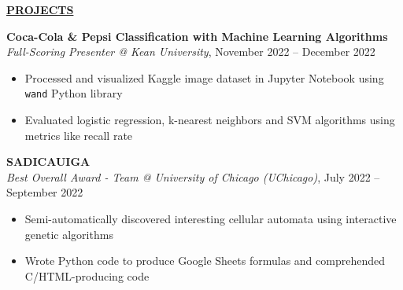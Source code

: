 \documentclass[
]{article}
\providecommand{\tightlist}{%
  \setlength{\itemsep}{0pt}\setlength{\parskip}{0pt}}
\begin{document}
\textbf{\underline{PROJECTS}}

\textbf{Coca-Cola \& Pepsi Classification with Machine Learning Algorithms} \\
\emph{Full-Scoring Presenter @ Kean University}, November 2022 -- December 2022

\begin{itemize}
\tightlist
\item
Processed and visualized Kaggle image dataset in Jupyter Notebook using \texttt{wand} Python library 
\end{itemize}

\begin{itemize}
\tightlist
\item
Evaluated logistic regression, k-nearest neighbors and SVM algorithms using metrics like recall rate  
\end{itemize}

\textbf{SADICAUIGA} \\
\emph{Best Overall Award - Team @ University of Chicago (UChicago)}, July 2022 -- September 2022 %
\begin{itemize}
\tightlist
\item
Semi-automatically discovered interesting cellular automata using interactive genetic algorithms
\end{itemize}

\begin{itemize}
\tightlist
\item
Wrote Python code to produce Google Sheets formulas and comprehended C/HTML-producing code
\end{itemize}









\end{document}
